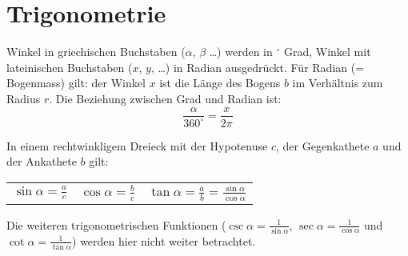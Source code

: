 \section{Trigonometrie}
Winkel in griechischen Buchstaben ($\alpha$, $\beta$ \dots) werden in $^\circ$ Grad, Winkel mit lateinischen Buchstaben ($x$, $y$, \dots) in Radian ausgedrückt.
Für Radian (= Bogenmass) gilt: der Winkel $x$ ist die Länge des Bogens $b$ im Verhältnis zum Radius $r$. Die Beziehung zwischen Grad und Radian ist:
\begin{equation*}
	\frac{\alpha}{360^{\circ}} = \frac{x}{2\pi}
\end{equation*}

In einem rechtwinkligem Dreieck mit der Hypotenuse $c$, der Gegenkathete $a$ und der Ankathete $b$ gilt:
\begin{tabular}{@{}p{}%
				@{}p{}%
				@{}p{}}
	$\sin{\alpha} = \frac{a}{c}$ & $\cos{\alpha} = \frac{b}{c}$ & $\tan{\alpha} = \frac{a}{b} = \frac{\sin{\alpha}}{\cos{\alpha}}$\\
\end{tabular}
Die weiteren trigonometrischen Funktionen ($\csc\alpha = \frac{1}{\sin\alpha}$, $\sec\alpha = \frac{1}{\cos\alpha}$ und $\cot\alpha = \frac{1}{\tan\alpha}$) werden hier
nicht weiter betrachtet.

